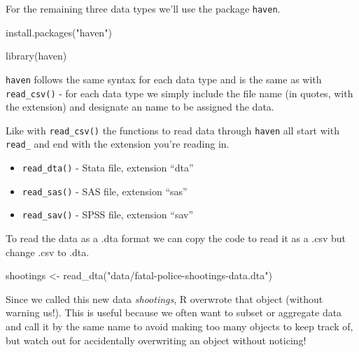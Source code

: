 \documentclass[
  12pt,
]{book}
\newenvironment{Shaded}{\begin{snugshade}}{\end{snugshade}}
\newcommand{\FunctionTok}[1]{\textcolor[rgb]{0,0,0}{#1}}
\newcommand{\NormalTok}[1]{#1}
\newcommand{\OtherTok}[1]{\textcolor[rgb]{0.37,0.37,0.37}{#1}}
\newcommand{\StringTok}[1]{\textcolor[rgb]{0.5,0.5,0.5}{#1}}
\providecommand{\tightlist}{%
  \setlength{\itemsep}{0pt}\setlength{\parskip}{0pt}}
\begin{document}
For the remaining three data types we'll use the package \texttt{haven}.

\begin{Shaded}
\begin{Highlighting}[]
\FunctionTok{install.packages}\NormalTok{(}\StringTok{"haven"}\NormalTok{)}
\end{Highlighting}
\end{Shaded}

\begin{Shaded}
\begin{Highlighting}[]
\FunctionTok{library}\NormalTok{(haven)}
\end{Highlighting}
\end{Shaded}

\texttt{haven} follows the same syntax for each data type and is the same as with \texttt{read\_csv()} - for each data type we simply include the file name (in quotes, with the extension) and designate an name to be assigned the data.

Like with \texttt{read\_csv()} the functions to read data through \texttt{haven} all start with \texttt{read\_} and end with the extension you're reading in.

\begin{itemize}
\tightlist
\item
  \texttt{read\_dta()} - Stata file, extension ``dta''
\item
  \texttt{read\_sas()} - SAS file, extension ``sas''
\item
  \texttt{read\_sav()} - SPSS file, extension ``sav''
\end{itemize}

To read the data as a .dta format we can copy the code to read it as a .csv but change .csv to .dta.

\begin{Shaded}
\begin{Highlighting}[]
\NormalTok{shootings }\OtherTok{\textless{}{-}} \FunctionTok{read\_dta}\NormalTok{(}\StringTok{"data/fatal{-}police{-}shootings{-}data.dta"}\NormalTok{)}
\end{Highlighting}
\end{Shaded}

Since we called this new data \emph{shootings}, R overwrote that object (without warning us!). This is useful because we often want to subset or aggregate data and call it by the same name to avoid making too many objects to keep track of, but watch out for accidentally overwriting an object without noticing!
\end{document}
